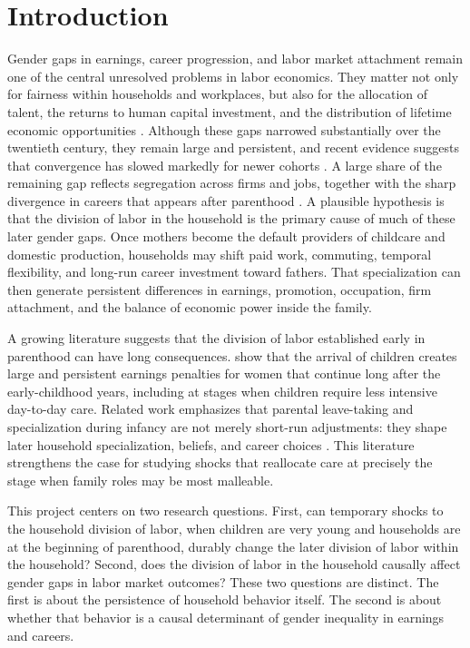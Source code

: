 \documentclass[12pt]{article}
\begin{document}

\section{Introduction}

Gender gaps in earnings, career progression, and labor market attachment remain one of the central unresolved problems in labor economics. They matter not only for fairness within households and workplaces, but also for the allocation of talent, the returns to human capital investment, and the distribution of lifetime economic opportunities \citep{hsieh2019allocation}. Although these gaps narrowed substantially over the twentieth century, they remain large and persistent, and recent evidence suggests that convergence has slowed markedly for newer cohorts \citep{goldin2014grand,arellano2024one}. A large share of the remaining gap reflects segregation across firms and jobs, together with the sharp divergence in careers that appears after parenthood \citep{blau2016gender,card2016bargaining,kleven2019children, albanesi2023families}. A plausible hypothesis is that the division of labor in the household is the primary cause of much of these later gender gaps. Once mothers become the default providers of childcare and domestic production, households may shift paid work, commuting, temporal flexibility, and long-run career investment toward fathers. That specialization can then generate persistent differences in earnings, promotion, occupation, firm attachment, and the balance of economic power inside the family.

A growing literature suggests that the division of labor established early in parenthood can have long consequences. \citet{kleven2019childpenalties} show that the arrival of children creates large and persistent earnings penalties for women that continue long after the early-childhood years, including at stages when children require less intensive day-to-day care. Related work emphasizes that parental leave-taking and specialization during infancy are not merely short-run adjustments: they shape later household specialization, beliefs, and career choices \citep{moberg2023gendered,kleven2026paternity}. This literature strengthens the case for studying shocks that reallocate care at precisely the stage when family roles may be most malleable.

This project centers on two research questions. First, can temporary shocks to the household division of labor, when children are very young and households are at the beginning of parenthood, durably change the later division of labor within the household? Second, does the division of labor in the household causally affect gender gaps in labor market outcomes? These two questions are distinct. The first is about the persistence of household behavior itself. The second is about whether that behavior is a causal determinant of gender inequality in earnings and careers.
\end{document}
